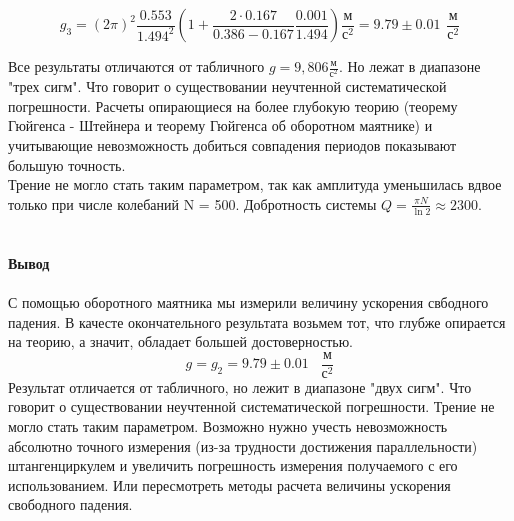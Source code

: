 \documentclass[a4paper, 12pt]{article}
\begin{document}
$$ g_3 = (2\pi)^2\frac{0.553}{1.494^2}(1 + \frac{2\cdot0.167}{0.386 - 0.167}\frac{0.001}{1.494})\frac{м}{с^2} = 9.79 \pm 0.01 \hspace{5pt} \frac{м}{с^2}$$

Все результаты отличаются от табличного $g = 9,806 \frac{м}{с^2}$. Но лежат в диапазоне "трех сигм". Что говорит о существовании неучтенной систематической погрешности. Расчеты опирающиеся на более глубокую теорию (теорему Гюйгенса - Штейнера и теорему Гюйгенса об оборотном маятнике) и учитывающие невозможность добиться совпадения периодов показывают большую точность. \\
Трение не могло стать таким параметром, так как амплитуда уменьшилась вдвое только при числе колебаний N = 500. Добротность системы 
 $Q =\frac{\pi N}{\ln2} \approx 2300 $.\\\\\\
\textbf{Вывод}\\\\
С помощью оборотного маятника мы измерили величину ускорения свбодного падения. В качесте окончательного результата возьмем тот, что глубже опирается на теорию, а значит, обладает большей достоверностью.
 $$g = g_2 = 9.79 \pm 0.01 \hspace{10pt} \frac{м}{с^2} $$
Результат отличается от табличного, но лежит в диапазоне "двух сигм". Что говорит о существовании неучтенной систематической погрешности. Трение не могло стать таким параметром. Возможно нужно учесть невозможность абсолютно точного измерения (из-за трудности достижения параллельности) штангенциркулем и увеличить погрешность измерения получаемого с его использованием. Или пересмотреть методы расчета величины ускорения свободного падения.
 
 
\end{document}
